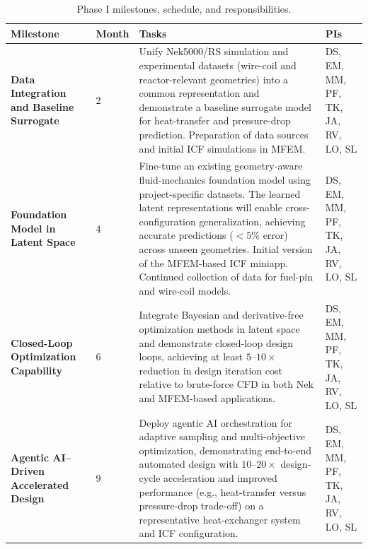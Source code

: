 \begin{table}[t]
\centering
\renewcommand{\arraystretch}{1.15}
\setlength{\tabcolsep}{5pt}

\begin{tabularx}{\textwidth}{|
>{\raggedright\arraybackslash}p{2.2cm}|
>{\raggedright\arraybackslash}p{1.5cm}|
>{\raggedright\arraybackslash}X|
>{\raggedright\arraybackslash}p{2.2cm}|}

\hline
\textbf{Milestone} &
\textbf{Month} &
\textbf{Tasks} &
\textbf{PIs} \\
\hline

\textbf{Data Integration and Baseline Surrogate}
&
2
&
Unify Nek5000/RS simulation and experimental datasets (wire-coil and reactor-relevant geometries) into a common representation and demonstrate a baseline surrogate model for heat-transfer and pressure-drop prediction. Preparation of data sources and initial ICF simulations in MFEM.
&
DS, EM, MM, PF, TK, JA, RV, LO, SL 
\\
\hline

\textbf{Foundation Model in Latent Space}
&
4
&
Fine-tune an existing geometry-aware fluid-mechanics foundation model using project-specific datasets. The learned latent representations will enable cross-configuration generalization, achieving accurate predictions ($<5\%$ error) across unseen geometries. Initial version of the MFEM-based ICF miniapp. Continued collection of data for fuel-pin and wire-coil models.
&
DS, EM, MM, PF, TK, JA, RV, LO, SL 
\\
\hline

\textbf{Closed-Loop Optimization Capability}
&
6
&
Integrate Bayesian and derivative-free optimization methods in latent space and demonstrate closed-loop design loops, achieving at least $5$--$10\times$ reduction in design iteration cost relative to brute-force CFD in both Nek and MFEM-based applications.
&
DS, EM, MM, PF, TK, JA, RV, LO, SL 
\\
\hline

\textbf{Agentic AI–Driven Accelerated Design}
&
9
&
Deploy agentic AI orchestration for adaptive sampling and multi-objective optimization, demonstrating end-to-end automated design with $10$--$20\times$ design-cycle acceleration and improved performance (e.g., heat-transfer versus pressure-drop trade-off) on a representative heat-exchanger system and ICF configuration.
&
DS, EM, MM, PF, TK, JA, RV, LO, SL 
\\
\hline

\end{tabularx}

\caption{Phase I milestones, schedule, and responsibilities.}
\label{tab:phase1_milestones}

\end{table}
